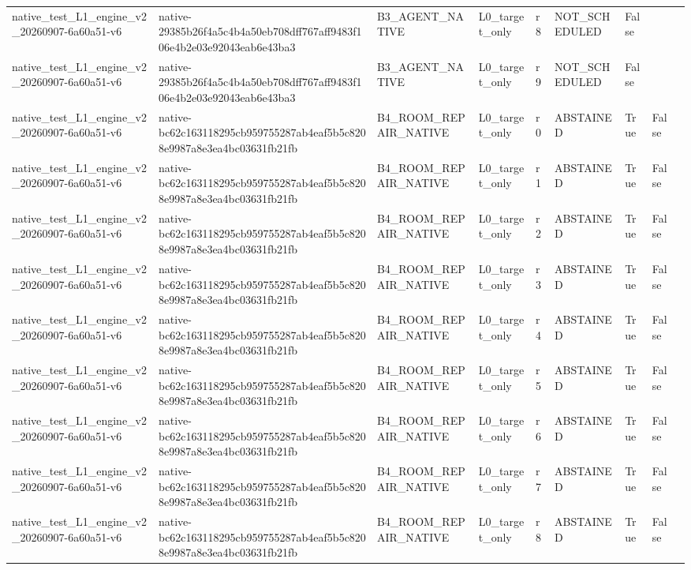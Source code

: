 \begin{tabular}{lllllllll}
native\_test\_L1\_engine\_v2\_20260907-6a60a51-v6 & native-29385b26f4a5c4b4a50eb708dff767aff9483f106e4b2e03e92043eab6e43ba3 & B3\_AGENT\_NATIVE & L0\_target\_only & r8 & NOT\_SCHEDULED & False &  &  \\
native\_test\_L1\_engine\_v2\_20260907-6a60a51-v6 & native-29385b26f4a5c4b4a50eb708dff767aff9483f106e4b2e03e92043eab6e43ba3 & B3\_AGENT\_NATIVE & L0\_target\_only & r9 & NOT\_SCHEDULED & False &  &  \\
native\_test\_L1\_engine\_v2\_20260907-6a60a51-v6 & native-bc62c163118295cb959755287ab4eaf5b5c8208e9987a8e3ea4bc03631fb21fb & B4\_ROOM\_REPAIR\_NATIVE & L0\_target\_only & r0 & ABSTAINED & True & False &  \\
native\_test\_L1\_engine\_v2\_20260907-6a60a51-v6 & native-bc62c163118295cb959755287ab4eaf5b5c8208e9987a8e3ea4bc03631fb21fb & B4\_ROOM\_REPAIR\_NATIVE & L0\_target\_only & r1 & ABSTAINED & True & False &  \\
native\_test\_L1\_engine\_v2\_20260907-6a60a51-v6 & native-bc62c163118295cb959755287ab4eaf5b5c8208e9987a8e3ea4bc03631fb21fb & B4\_ROOM\_REPAIR\_NATIVE & L0\_target\_only & r2 & ABSTAINED & True & False &  \\
native\_test\_L1\_engine\_v2\_20260907-6a60a51-v6 & native-bc62c163118295cb959755287ab4eaf5b5c8208e9987a8e3ea4bc03631fb21fb & B4\_ROOM\_REPAIR\_NATIVE & L0\_target\_only & r3 & ABSTAINED & True & False &  \\
native\_test\_L1\_engine\_v2\_20260907-6a60a51-v6 & native-bc62c163118295cb959755287ab4eaf5b5c8208e9987a8e3ea4bc03631fb21fb & B4\_ROOM\_REPAIR\_NATIVE & L0\_target\_only & r4 & ABSTAINED & True & False &  \\
native\_test\_L1\_engine\_v2\_20260907-6a60a51-v6 & native-bc62c163118295cb959755287ab4eaf5b5c8208e9987a8e3ea4bc03631fb21fb & B4\_ROOM\_REPAIR\_NATIVE & L0\_target\_only & r5 & ABSTAINED & True & False &  \\
native\_test\_L1\_engine\_v2\_20260907-6a60a51-v6 & native-bc62c163118295cb959755287ab4eaf5b5c8208e9987a8e3ea4bc03631fb21fb & B4\_ROOM\_REPAIR\_NATIVE & L0\_target\_only & r6 & ABSTAINED & True & False &  \\
native\_test\_L1\_engine\_v2\_20260907-6a60a51-v6 & native-bc62c163118295cb959755287ab4eaf5b5c8208e9987a8e3ea4bc03631fb21fb & B4\_ROOM\_REPAIR\_NATIVE & L0\_target\_only & r7 & ABSTAINED & True & False &  \\
native\_test\_L1\_engine\_v2\_20260907-6a60a51-v6 & native-bc62c163118295cb959755287ab4eaf5b5c8208e9987a8e3ea4bc03631fb21fb & B4\_ROOM\_REPAIR\_NATIVE & L0\_target\_only & r8 & ABSTAINED & True & False &  \\

\end{tabular}
